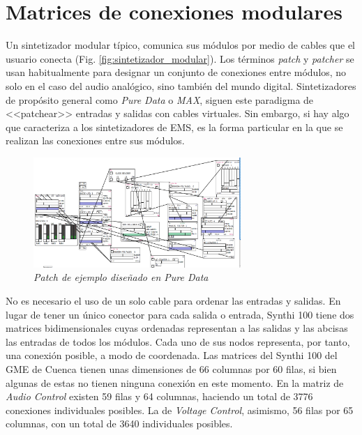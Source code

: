 \section{Matrices de conexiones modulares}
\label{sec:patchbay}

Un sintetizador modular típico, comunica sus módulos por medio de cables que el usuario conecta (Fig. \ref{fig:sintetizador_modular}). Los términos \textit{patch} y \textit{patcher} se usan habitualmente para designar un conjunto de conexiones entre módulos, no solo en el caso del audio analógico, sino también del mundo digital. Sintetizadores de propósito general como \textit{Pure Data} o \textit{MAX}, siguen este paradigma de <<patchear>> entradas y salidas con cables virtuales. Sin embargo, si hay algo que caracteriza a los sintetizadores de EMS, es la forma particular en la que se realizan las conexiones entre sus módulos. 
	
\begin{figure}
	\centering
	\includegraphics[width=0.7\textwidth]{images/pd_patch_example}
	\caption[\textit{Patch de ejemplo diseñado en \textit{Pure Data}}]{\textit{Patch de ejemplo diseñado en \textit{Pure Data}}}
	\label{fig:pd_patch_example}
\end{figure}
	

No es necesario el uso de un solo cable para ordenar las entradas y salidas. En lugar de tener un único conector para cada salida o entrada, Synthi 100 tiene dos matrices bidimensionales cuyas ordenadas representan a las salidas y las abcisas las entradas de todos los módulos. Cada uno de sus nodos representa, por tanto, una conexión posible, a modo de coordenada. Las matrices del Synthi 100 del GME de Cuenca tienen unas dimensiones de 66 columnas por 60 filas, si bien algunas de estas no tienen ninguna conexión en este momento. En la matriz de \textit{Audio Control} existen 59 filas y 64 columnas, haciendo un total de 3776 conexiones individuales posibles. La de \textit{Voltage Control}, asimismo, 56 filas por 65 columnas, con un total de 3640 individuales posibles.

